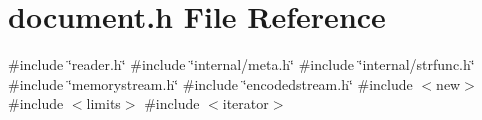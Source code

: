 \hypertarget{a00476}{}\section{document.\+h File Reference}
\label{a00476}
{\ttfamily \#include \char`\"{}reader.\+h\char`\"{}}\newline
{\ttfamily \#include \char`\"{}internal/meta.\+h\char`\"{}}\newline
{\ttfamily \#include \char`\"{}internal/strfunc.\+h\char`\"{}}\newline
{\ttfamily \#include \char`\"{}memorystream.\+h\char`\"{}}\newline
{\ttfamily \#include \char`\"{}encodedstream.\+h\char`\"{}}\newline
{\ttfamily \#include $<$new$>$}\newline
{\ttfamily \#include $<$limits$>$}\newline
{\ttfamily \#include $<$iterator$>$}\newline
